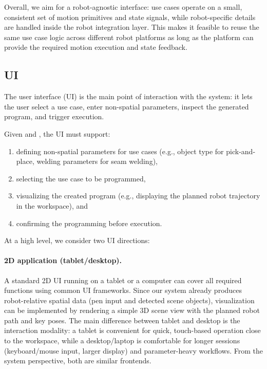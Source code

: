 Overall, we aim for a robot-agnostic interface: use cases operate on a small, consistent set of motion primitives and state signals, while robot-specific details are handled inside the robot integration layer. This makes it feasible to reuse the same use case logic across different robot platforms as long as the platform can provide the required motion execution and state feedback.

\subsection{UI} \label{subsec:ch2_analysis_ui}

The user interface (UI) is the main point of interaction with the system: it lets the user select a use case, enter non-spatial parameters, inspect the generated program, and trigger execution.

Given  and , the UI must support:
\begin{enumerate}[label=(\roman*)]
    \item defining non-spatial parameters for use cases (e.g., object type for pick-and-place, welding parameters for seam welding),
    \item selecting the use case to be programmed,
    \item visualizing the created program (e.g., displaying the planned robot trajectory in the workspace), and
    \item confirming the programming before execution.
\end{enumerate}

At a high level, we consider two UI directions:

\paragraph{2D application (tablet/desktop).}
A standard 2D UI running on a tablet or a computer can cover all required functions using common UI frameworks. Since our system already produces robot-relative spatial data (pen input and detected scene objects), visualization can be implemented by rendering a simple 3D scene view with the planned robot path and key poses. The main difference between tablet and desktop is the interaction modality: a tablet is convenient for quick, touch-based operation close to the workspace, while a desktop/laptop is comfortable for longer sessions (keyboard/mouse input, larger display) and parameter-heavy workflows. From the system perspective, both are similar frontends.

